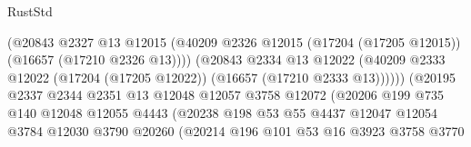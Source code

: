 \begin{lexlean}{RustStd}
\begin{coremodule}
                                        (@20843
                                          @2327
                                          @13
                                          @12015
                                          (@40209
                                            @2326
                                            @12015
                                            (@17204 (@17205 @12015))
                                            (@16657 (@17210 @2326 @13))))
                                        (@20843
                                          @2334
                                          @13
                                          @12022
                                          (@40209
                                            @2333
                                            @12022
                                            (@17204 (@17205 @12022))
                                            (@16657 (@17210 @2333 @13))))))
                                    (@20195
                                      @2337
                                      @2344
                                      @2351
                                      @13
                                      @12048
                                      @12057
                                      @3758
                                      @12072
                                      (@20206
                                        @199
                                        @735
                                        @140
                                        @12048
                                        @12055
                                        @4443
                                        (@20238
                                          @198
                                          @53
                                          @55
                                          @4437
                                          @12047
                                          @12054
                                          @3784
                                          @12030
                                          @3790
                                          @20260
                                          (@20214
                                            @196
                                            @101
                                            @53
                                            @16
                                            @3923
                                            @3758
                                            @3770

\end{coremodule}
\end{lexlean}
